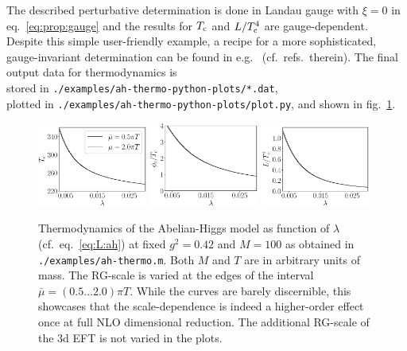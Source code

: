 \documentclass[11pt]{article}
\newcommand{\Tc}{T_{\rm c}}
\newcommand{\bmu}{\bar\mu}
\begin{document}
The described perturbative determination is done in Landau gauge
with $\xi = 0$ in eq.~\eqref{eq:prop:gauge} and
the results for $\Tc$ and $L/\Tc^4$ are gauge-dependent.
Despite this simple user-friendly example,
a recipe for a more sophisticated, gauge-invariant determination can be found
in e.g.~\cite{Schicho:2022wty} (cf.\ refs.\ therein).
%
The final output data for thermodynamics is\\
stored in
{\tt ./examples/ah-thermo-python-plots/*.dat},\\ 
plotted in {\tt ./examples/ah-thermo-python-plots/plot.py}, and
shown in fig.~\ref{fig:ah-thermo}.
\begin{figure}[t]
\centering
\includegraphics[width=0.32\textwidth]{./figures/Tc.eps} 
\includegraphics[width=0.32\textwidth]{./figures/phicTc.eps} 
\includegraphics[width=0.32\textwidth]{./figures/latentheat.eps}  
\caption{%
  Thermodynamics of
  the Abelian-Higgs model as function of $\lambda$ (cf.~eq.~\eqref{eq:L:ah})
  at fixed
  $g^2=0.42$ and
  $M=100$
  as obtained in
  {\tt ./examples/ah-thermo.m}.
  Both $M$ and $T$ are in arbitrary units of mass.
  The RG-scale is varied at the edges of the interval
  $\bmu = (0.5\dots2.0)\pi T$.
  While the curves are barely discernible,
  this showcases that the scale-dependence is indeed a higher-order effect
  once at full NLO dimensional reduction.
  The additional RG-scale of the 3d EFT is not varied in the plots.  
}
\label{fig:ah-thermo}
\end{figure}
\end{document}
